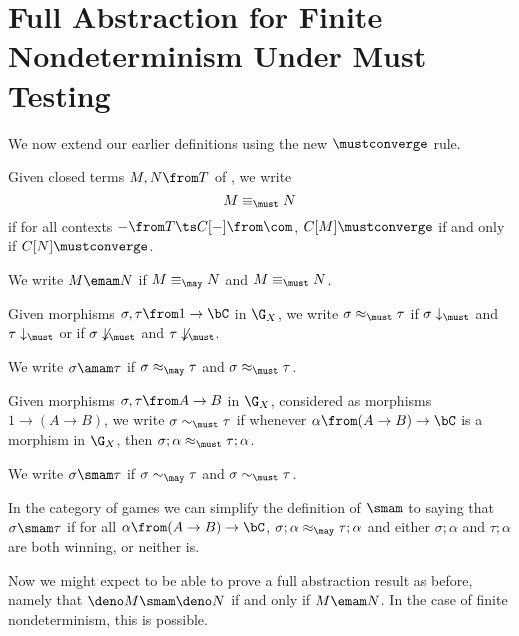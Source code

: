 \section{Full Abstraction for Finite Nondeterminism Under Must Testing}

We now extend our earlier definitions using the new $\mustconverge$ rule.

\begin{definition}
  Given closed terms $M,N\from T$ of \IAX, we write 
  \[
    M\equiv_{\must} N
    \]
  if for all contexts $-\from T\ts C[-]\from\com$, $C[M]\mustconverge$ if and only if $C[N]\mustconverge$.
\end{definition}

We write $M\emam N$ if $M\equiv_{\may} N$ and $M\equiv_{\must} N$.

\begin{definition}
  Given morphisms $\sigma,\tau \from 1 \to \bC$ in $\G_X$, we write $\sigma\approx_{\must}\tau$ if $\sigma\downarrow_{\must}$ and $\tau\downarrow_{\must}$ or if $\sigma\not\downarrow_{\must}$ and $\tau\not\downarrow_{\must}$.  
\end{definition}

We write $\sigma\amam \tau$ if $\sigma\approx_{\may}\tau$ and $\sigma\approx_{\must}\tau$.

\begin{definition}
  Given morphisms $\sigma,\tau\from A \to B$ in $\G_X$, considered as morphisms $1 \to (A \to B)$, we write $\sigma\sim_{\must}\tau$ if whenever $\alpha\from (A \to B) \to \bC$ is a morphism in $\G_X$, then $\sigma;\alpha\approx_{\must}\tau;\alpha$.
\end{definition}

We write $\sigma\smam \tau$ if $\sigma\sim_{\may}\tau$ and $\sigma\sim_{\must} \tau$.

\begin{remark}
  In the category of games we can simplify the definition of $\smam$ to saying that $\sigma\smam \tau$ if for all $\alpha\from (A \to B) \to \bC$, $\sigma;\alpha\approx_{\may}\tau;\alpha$ and either $\sigma;\alpha$ and $\tau;\alpha$ are both winning, or neither is.
\end{remark}

Now we might expect to be able to prove a full abstraction result as before, namely that $\deno M\smam \deno N$ if and only if $M\emam N$.  
In the case of finite nondeterminism, this is possible.

